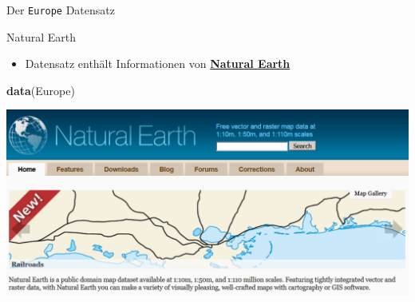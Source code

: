 \documentclass[ignorenonframetext,]{beamer}
\newenvironment{Shaded}{\begin{snugshade}}{\end{snugshade}}
\newcommand{\KeywordTok}[1]{\textcolor[rgb]{0.13,0.29,0.53}{\textbf{#1}}}
\newcommand{\NormalTok}[1]{#1}
\providecommand{\tightlist}{%
  \setlength{\itemsep}{0pt}\setlength{\parskip}{0pt}}
\begin{document}
\begin{frame}[fragile]{Der \texttt{Europe} Datensatz}
\protect\hypertarget{der-europe-datensatz}{}

\begin{block}{Natural Earth}

\begin{itemize}
\tightlist
\item
  Datensatz enthält Informationen von
  \href{http://www.naturalearthdata.com/}{\textbf{Natural Earth}}
\end{itemize}

\begin{Shaded}
\begin{Highlighting}[]
\KeywordTok{data}\NormalTok{(Europe)}
\end{Highlighting}
\end{Shaded}

\includegraphics{figure/NaturalEarthData.PNG}

\end{block}

\end{frame}
\end{document}
